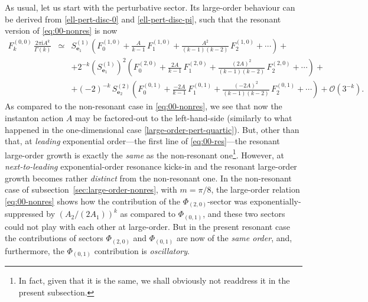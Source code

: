\documentclass[11pt,a4paper]{article}
\begin{document}
As usual, let us start with the perturbative sector. Its large-order behaviour can be derived from \eqref{ell-pert-disc-0} and \eqref{ell-pert-disc-pi}, such that the resonant version of \eqref{eq:00-nonres} is now
%
\begin{eqnarray}
\label{eq:00-res}
F_k^{(0,0)}\, \frac{2\pi\mathrm{i} A^{k}}{\Gamma(k)} &\simeq& S^{(1)}_{\boldsymbol{e}_1} \left( F^{(1,0)}_0 + \frac{A}{k-1}\, F^{(1,0)}_1 + \frac{A^2}{(k-1)(k-2)}\, F^{(1,0)}_2 + \cdots \right) + \\
&& + 2^{-k} \left( S^{(1)}_{\boldsymbol{e}_1} \right)^2 \left( F^{(2,0)}_0 + \frac{2A}{k-1}\, F^{(2,0)}_1 + \frac{(2A)^2}{(k-1)(k-2)}\, F^{(2,0)}_2 + \cdots \right) + \nonumber \\
&& + (-2)^{-k}\, S^{(2)}_{\boldsymbol{e}_2} \left( F^{(0,1)}_0 + \frac{-2A}{k-1}\, F^{(0,1)}_1 + \frac{(-2A)^2}{(k-1)(k-2)}\, F^{(0,1)}_2 + \cdots \right) + \mathcal{O}(3^{-k}). \nonumber
\end{eqnarray} 
%
\noindent
As compared to the non-resonant case in \eqref{eq:00-nonres}, we see that now the instanton action $A$ may be factored-out to the left-hand-side (similarly to what happened in the one-dimensional case \eqref{large-order-pert-quartic}). But, other than that, at \textit{leading} exponential order---the first line of \eqref{eq:00-res}---the resonant large-order growth is exactly the \textit{same} as the non-resonant one\footnote{In fact, given that it is the same, we shall obviously not readdress it in the present subsection.}. However, at \textit{next-to-leading} exponential-order resonance kicks-in and the resonant large-order growth becomes rather \textit{distinct} from the non-resonant one. In the non-resonant case of subsection~\ref{sec:large-order-nonres}, with $m=\pi/8$, the large-order relation \eqref{eq:00-nonres} shows how the contribution of the $\Phi_{(2,0)}$-sector was exponentially-suppressed by $(A_2/(2A_1))^k$ as compared to $\Phi_{(0,1)}$, and these two sectors could not play with each other at large-order. But in the present resonant case the contributions of sectors $\Phi_{(2,0)}$ and $\Phi_{(0,1)}$ are now of the \textit{same order}, and, furthermore, the $\Phi_{(0,1)}$ contribution is \textit{oscillatory}. 
\end{document}
